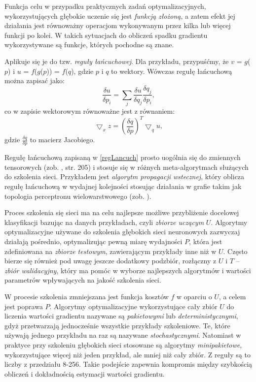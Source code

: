Funkcja celu w przypadku praktycznych zadań optymalizacyjnych, wykorzystujących głębokie uczenie się jest \textit{funkcją złożoną}, a zatem efekt jej działania jest równoważny operacjom wykonywanym przez kilka lub więcej funkcji po kolei. W takich sytuacjach do obliczeń spadku gradientu wykorzystywane są funkcje, których pochodne są znane.

Aplikuje się je do tzw. \textit{reguły łańcuchowej}. Dla przykładu, przypuśćmy, że $v$ = $g$($p$) i $u$ = $f$($g$($p$)) = $f$($q$), gdzie $p$ i $q$ to wektory. Wówczas regułę łańcuchową można zapisać jako:
\begin{equation}
\frac{\delta u}{\delta p_i} = \sum_{j} \frac{\delta u}{\delta q_j} \frac{\delta q_j}{\delta p_i}, 
\end{equation}
co w zapisie wektorowym równoważne jest z równaniem:
\begin{equation}
\label{regLancuch}
\bigtriangledown_x z = (\frac{\delta q}{\delta p})^T \bigtriangledown_q u, 
\end{equation}
gdzie $\frac{\delta q}{\delta p}$ to macierz Jacobiego. 

Regułę łańcuchową zapisaną w \ref{regLancuch} prosto uogólnia się do zmiennych tensorowych (zob. \cite{Goodfellow-et-al-2016}, str. 205) i stosuje się w różnych meta-algorytmach służących do szkolenia sieci. Przykładem jest \textit{algorytm propagacji wstecznej}, który oblicza regułę łańcuchową w wydajnej kolejności stosując działania w grafie takim jak topologia perceptronu wielowarstwowego (zob. \cite{Goodfellow-et-al-2016}).

Proces szkolenia się sieci ma na celu najlepsze możliwe przybliżenie docelowej klasyfikacji bazując na danych przykładach, czyli \textit{zbiorze uczącym} $U$. Algorytmy optymalizacyjne używane do szkolenia głębokich sieci neuronowych zazwyczaj działają pośrednio, optymalizując pewną miarę wydajności $P$, która jest zdefiniowana na \textit{zbiorze testowym}, zawierającym przykłady inne niż w $U$. Często bierze się również pod uwagę jeszcze dodatkowy podzbiór, rozłączny z $U$ i $T$ -- \textit{zbiór walidacyjny}, który ma pomóc w wyborze najlepszych algorytmów i wartości parametrów wpływających na jakość szkolenia sieci.

W procesie szkolenia zmniejszana jest funkcja kosztów $f$ w oparciu o $U$, a celem jest poprawa $P$. Algorytmy optymalizacyjne wykorzystujące cały zbiór $U$ do liczenia wartości gradientu nazywane są \textit{pakietowymi} lub \textit{deterministycznymi}, gdyż przetwarzają jednocześnie wszystkie przykłady szkoleniowe. Te, które używają jednego przykładu na raz są nazywane \textit{stochastycznymi}. Natomiast w praktyce przy szkoleniu głębokich sieci stosowane są algorytmy \textit{minipakietowe}, wykorzystujące więcej niż jeden przykład, ale mniej niż cały zbiór. Z reguły są to liczby z przedziału 8-256. Takie podejście zapewnia kompromis między szybkością obliczeń i dokładnością estymacji wartości gradientu.

